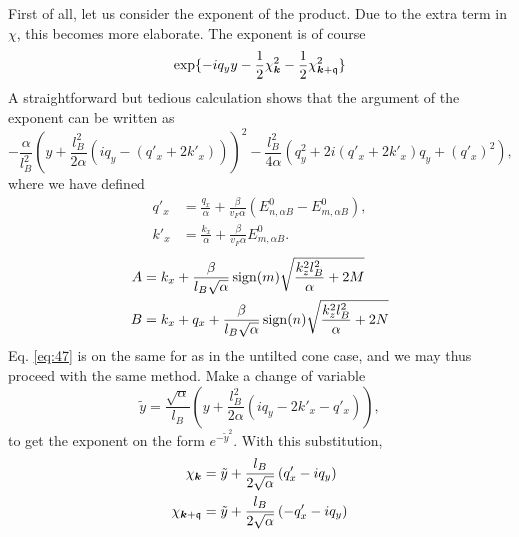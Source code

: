 First of all, let us consider the exponent of the product.
Due to the extra term in \(\chi\), this becomes more elaborate.
The exponent is of course
\begin{equation}
  \label{eq:46}
  \exp\{-i q_{y} y - \frac{1}{2} \chi_{\bm{k}} ^2 - \frac{1}{2} \chi _{\bm{k} + \mathfrak{q}}^2\}
\end{equation}
A straightforward but tedious calculation shows that the argument of the exponent can be written as
\begin{equation}
  \label{eq:47}
  -\frac{\alpha}{l_{B}^2} \left(y + \frac{l_{B}^2}{2 \alpha } (i q_{y} - (q'_x + 2 k'_x))\right)^2
  -\frac{l_{B}^2}{4 \alpha } (q_{y}^2 + 2i (q'_x + 2 k'_x) q_{y} + ( q' _{x} )^2 ),
\end{equation}
where we have defined
\begin{align}
  q' _x &= \frac{q_x}{\alpha } + \frac{\beta}{v_{F} \alpha }( E^0_{n,\alpha B} - E^0_{m, \alpha B} ),\\
  k' _x &= \frac{k_x}{\alpha } + \frac{\beta}{v_F \alpha } E^0_{m, \alpha B}.
\end{align}
\begin{align}
  A &= k_{x} + \frac{\beta}{l_{B} \sqrt{\alpha }} \operatorname{sign}(m) \sqrt{\frac{k_{z}^2l_{B}^2}{\alpha } + 2 M}\\
  B &= k_{x} + q_{x} + \frac{\beta}{l_{B} \sqrt{\alpha }} \operatorname{sign}(n) \sqrt{\frac{k_{z}^2l_{B}^2}{\alpha } + 2 N}
\end{align}
Eq. \eqref{eq:47} is on the same for as in the untilted cone case, and we may thus proceed with the same method.
Make a change of variable
\[
\tilde{y} = \frac{\sqrt{\alpha }}{l_{B}} \left(y + \frac{l_{B}^2}{2\alpha } (iq_{y} - 2 k' _x - q' _x )\right),
\]
to get the exponent on the form \(e^{-\tilde{y}^2}\).
With this substitution,
\begin{align}
  \chi _{\bm{k}} &= \tilde{y} + \frac{l_{B}}{2 \sqrt{\alpha }} \left(q' _x - i q_{y}\right)\\
  \chi _{\bm{k} + \mathfrak{q}} &= \tilde{y} + \frac{l_{B}}{2 \sqrt{\alpha }} \left(- q' _x - i q_{y}\right)
\end{align}

